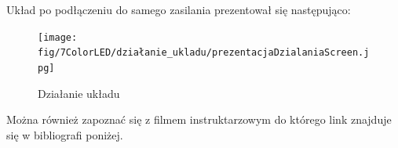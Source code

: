 \documentclass[11pt, a4paper]{article}
\begin{document}






Układ po podłączeniu do samego zasilania prezentował się następująco: 
\begin{figure}[h!]
    \centering
    \texttt{[image: fig/7ColorLED/działanie\_ukladu/prezentacjaDzialaniaScreen.jpg]}
    \caption{Działanie układu}
    \label{fig:dzialanie}
\end{figure}

Można również zapoznać się z filmem instruktarzowym do którego link znajduje się w bibliografi poniżej.


\printbibliography[heading=bibintoc]
\end{document}
